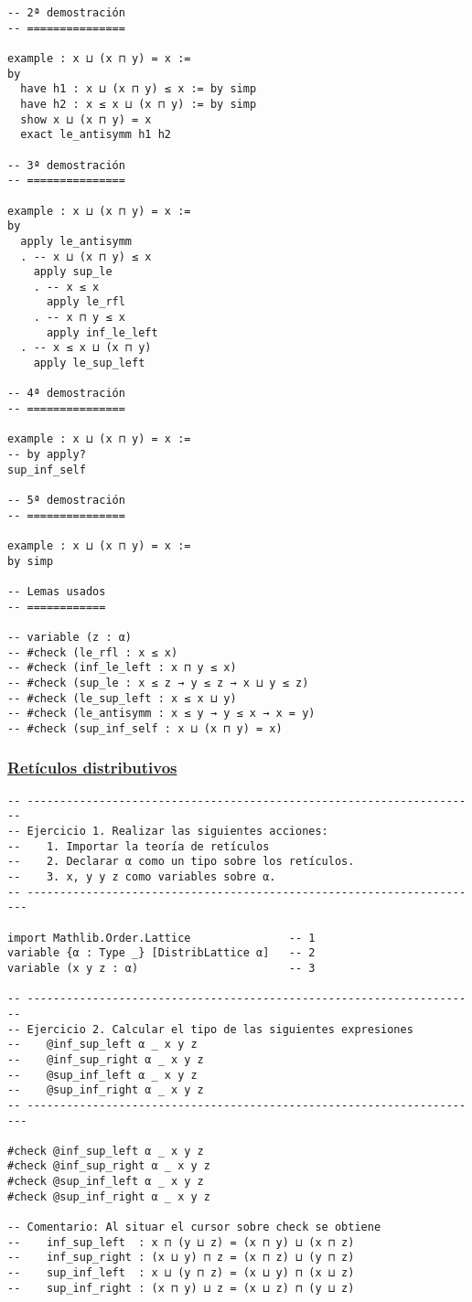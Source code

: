 \begin{verbatim}
-- 2ª demostración
-- ===============

example : x ⊔ (x ⊓ y) = x :=
by
  have h1 : x ⊔ (x ⊓ y) ≤ x := by simp
  have h2 : x ≤ x ⊔ (x ⊓ y) := by simp
  show x ⊔ (x ⊓ y) = x
  exact le_antisymm h1 h2

-- 3ª demostración
-- ===============

example : x ⊔ (x ⊓ y) = x :=
by
  apply le_antisymm
  . -- x ⊔ (x ⊓ y) ≤ x
    apply sup_le
    . -- x ≤ x
      apply le_rfl
    . -- x ⊓ y ≤ x
      apply inf_le_left
  . -- x ≤ x ⊔ (x ⊓ y)
    apply le_sup_left

-- 4ª demostración
-- ===============

example : x ⊔ (x ⊓ y) = x :=
-- by apply?
sup_inf_self

-- 5ª demostración
-- ===============

example : x ⊔ (x ⊓ y) = x :=
by simp

-- Lemas usados
-- ============

-- variable (z : α)
-- #check (le_rfl : x ≤ x)
-- #check (inf_le_left : x ⊓ y ≤ x)
-- #check (sup_le : x ≤ z → y ≤ z → x ⊔ y ≤ z)
-- #check (le_sup_left : x ≤ x ⊔ y)
-- #check (le_antisymm : x ≤ y → y ≤ x → x = y)
-- #check (sup_inf_self : x ⊔ (x ⊓ y) = x)
\end{verbatim}

\subsubsection{\href{./src/Basicos/Reticulos\_distributivos.lean}{Retículos distributivos}}
\label{sec:org290de7e}
\begin{verbatim}
-- ---------------------------------------------------------------------
-- Ejercicio 1. Realizar las siguientes acciones:
--    1. Importar la teoría de retículos
--    2. Declarar α como un tipo sobre los retículos.
--    3. x, y y z como variables sobre α.
-- ----------------------------------------------------------------------

import Mathlib.Order.Lattice               -- 1
variable {α : Type _} [DistribLattice α]   -- 2
variable (x y z : α)                       -- 3

-- ---------------------------------------------------------------------
-- Ejercicio 2. Calcular el tipo de las siguientes expresiones
--    @inf_sup_left α _ x y z
--    @inf_sup_right α _ x y z
--    @sup_inf_left α _ x y z
--    @sup_inf_right α _ x y z
-- ----------------------------------------------------------------------

#check @inf_sup_left α _ x y z
#check @inf_sup_right α _ x y z
#check @sup_inf_left α _ x y z
#check @sup_inf_right α _ x y z

-- Comentario: Al situar el cursor sobre check se obtiene
--    inf_sup_left  : x ⊓ (y ⊔ z) = (x ⊓ y) ⊔ (x ⊓ z)
--    inf_sup_right : (x ⊔ y) ⊓ z = (x ⊓ z) ⊔ (y ⊓ z)
--    sup_inf_left  : x ⊔ (y ⊓ z) = (x ⊔ y) ⊓ (x ⊔ z)
--    sup_inf_right : (x ⊓ y) ⊔ z = (x ⊔ z) ⊓ (y ⊔ z)
\end{verbatim}

